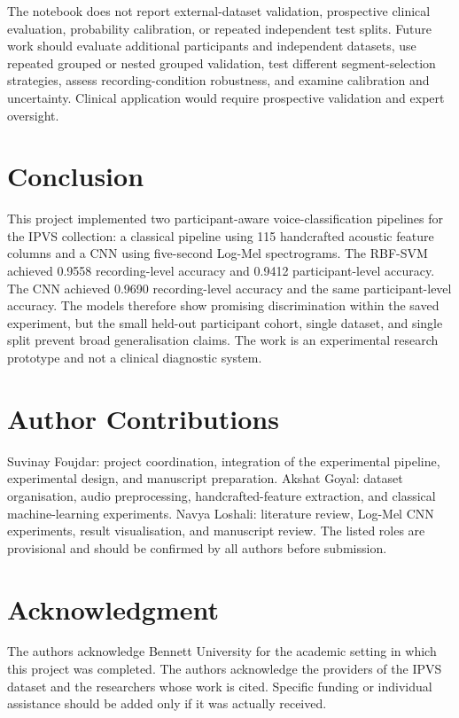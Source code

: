 \documentclass[11pt,a4paper]{article}
\begin{document}
The notebook does not report external-dataset validation, prospective clinical evaluation, probability calibration, or repeated independent test splits. Future work should evaluate additional participants and independent datasets, use repeated grouped or nested grouped validation, test different segment-selection strategies, assess recording-condition robustness, and examine calibration and uncertainty. Clinical application would require prospective validation and expert oversight.

\section{Conclusion}
This project implemented two participant-aware voice-classification pipelines for the IPVS collection: a classical pipeline using 115 handcrafted acoustic feature columns and a CNN using five-second Log-Mel spectrograms. The RBF-SVM achieved 0.9558 recording-level accuracy and 0.9412 participant-level accuracy. The CNN achieved 0.9690 recording-level accuracy and the same participant-level accuracy. The models therefore show promising discrimination within the saved experiment, but the small held-out participant cohort, single dataset, and single split prevent broad generalisation claims. The work is an experimental research prototype and not a clinical diagnostic system.

\section*{Author Contributions}
Suvinay Foujdar: project coordination, integration of the experimental pipeline, experimental design, and manuscript preparation. Akshat Goyal: dataset organisation, audio preprocessing, handcrafted-feature extraction, and classical machine-learning experiments. Navya Loshali: literature review, Log-Mel CNN experiments, result visualisation, and manuscript review. The listed roles are provisional and should be confirmed by all authors before submission.

\section*{Acknowledgment}
The authors acknowledge Bennett University for the academic setting in which this project was completed. The authors acknowledge the providers of the IPVS dataset and the researchers whose work is cited. Specific funding or individual assistance should be added only if it was actually received.
\end{document}
